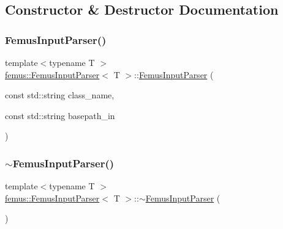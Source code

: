 \subsection{Constructor \& Destructor Documentation}
\mbox{\label{classfemus_1_1_femus_input_parser_a012881346421fc56c278db92d9b48858}} 
\subsubsection{\texorpdfstring{Femus\+Input\+Parser()}{FemusInputParser()}}
{\footnotesize\ttfamily template$<$typename T $>$ \\
\mbox{\hyperlink{classfemus_1_1_femus_input_parser}{femus\+::\+Femus\+Input\+Parser}}$<$ T $>$\+::\mbox{\hyperlink{classfemus_1_1_femus_input_parser}{Femus\+Input\+Parser}} (\begin{DoxyParamCaption}\item[{const std\+::string}]{class\+\_\+name,  }\item[{const std\+::string}]{basepath\+\_\+in }\end{DoxyParamCaption})}

\mbox{\label{classfemus_1_1_femus_input_parser_a83fce921560f1f0a19e351e2f87248b5}} 
\subsubsection{\texorpdfstring{$\sim$\+Femus\+Input\+Parser()}{~FemusInputParser()}}
{\footnotesize\ttfamily template$<$typename T $>$ \\
\mbox{\hyperlink{classfemus_1_1_femus_input_parser}{femus\+::\+Femus\+Input\+Parser}}$<$ T $>$\+::$\sim$\mbox{\hyperlink{classfemus_1_1_femus_input_parser}{Femus\+Input\+Parser}} (\begin{DoxyParamCaption}{ }\end{DoxyParamCaption})}



